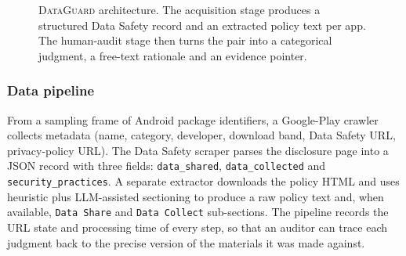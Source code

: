 \documentclass[11pt,a4paper]{article}
\newcommand{\dataguard}{\textsc{DataGuard}}
\begin{document}
\begin{figure}[t]
{}%
\caption{\dataguard{} architecture. The acquisition stage produces a
structured Data Safety record and an extracted policy text per app.
The human-audit stage then turns the pair into a categorical judgment,
a free-text rationale and an evidence pointer.}
\label{fig:architecture}
\end{figure}

\subsubsection{Data pipeline}
\label{subsec:pipeline}
From a sampling frame of Android package identifiers, a Google-Play
crawler collects metadata (name, category, developer, download band,
Data Safety URL, privacy-policy URL). The Data Safety scraper parses the
disclosure page into a JSON record with three fields: \texttt{data\_shared},
\texttt{data\_collected} and \texttt{security\_practices}. A separate
extractor downloads the policy HTML and uses heuristic plus LLM-assisted
sectioning to produce a raw policy text and, when available,
\texttt{Data Share} and \texttt{Data Collect} sub-sections. The pipeline
records the URL state and processing time of every step, so that an
auditor can trace each judgment back to the precise version of the
materials it was made against.
\end{document}
